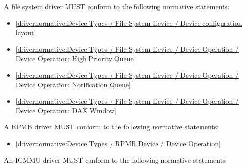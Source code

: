 \label{sec:Conformance / Driver Conformance / File System Driver Conformance}

A file system driver MUST conform to the following normative statements:

\begin{itemize}
\item \ref{drivernormative:Device Types / File System Device / Device configuration layout}
\item \ref{drivernormative:Device Types / File System Device / Device Operation / Device Operation: High Priority Queue}
\item \ref{drivernormative:Device Types / File System Device / Device Operation / Device Operation: Notification Queue}
\item \ref{drivernormative:Device Types / File System Device / Device Operation / Device Operation: DAX Window}
\end{itemize}

\label{sec:Conformance / Driver Conformance / RPMB Driver Conformance}

A RPMB driver MUST conform to the following normative statements:

\begin{itemize}
\item \ref{drivernormative:Device Types / RPMB Device / Device Operation}
\end{itemize}
\label{sec:Conformance / Driver Conformance / IOMMU Driver Conformance}

An IOMMU driver MUST conform to the following normative statements:

